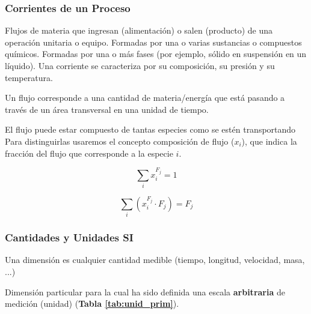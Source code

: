         \subsubsection{Corrientes de un Proceso}
        
        Flujos de materia que ingresan (alimentación) o salen (producto) de una operación unitaria o equipo. Formadas por una o varias sustancias o compuestos químicos. Formadas por una o más fases (por ejemplo, sólido en suspensión en un líquido). Una corriente se caracteriza por su composición, su presión y su temperatura.
        
            
            Un flujo corresponde a una cantidad de materia/energía que está pasando a través de un área transversal en una unidad de tiempo.
            
            El flujo puede estar compuesto de tantas especies como se estén transportando Para distinguirlas usaremos el concepto composición de flujo (\(x_{i}\)), que indica la fracción del flujo que corresponde a la especie \(i\).
            \begin{multicols}{2}
                \[\sum_{i} x_{i}^{F_{j}} = 1\]
                
                \[\sum_{i} \left ( x_{i}^{F_{j}} \cdot F_{j} \right ) = F_{j}\]
            \end{multicols}
        
        \subsubsection{Cantidades y Unidades SI}
        
        Una dimensión es cualquier cantidad medible (tiempo, longitud, velocidad, masa, ...)
        
            
            Dimensión particular para la cual ha sido definida una escala \textbf{arbitraria} de medición (unidad) (\textbf{Tabla \ref{tab:unid_prim}}).
            
